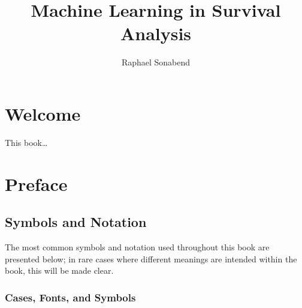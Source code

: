\documentclass[
  letterpaper,
]{scrbook}
\title{Machine Learning in Survival Analysis}
\author{Raphael Sonabend}
\date{}
\renewcommand*\contentsname{Table of contents}
\newcommand\contentsname{Table of contents}
\theoremstyle{plain}
\theoremstyle{definition}
\theoremstyle{remark}
\begin{document}
\frontmatter
\maketitle
\ifdefined\Shaded\renewenvironment{Shaded}{\begin{tcolorbox}[colback={shadecolor}, boxrule=0pt, enhanced, breakable, frame hidden]}{\end{tcolorbox}}\fi

\renewcommand*\contentsname{Table of contents}
{
\setcounter{tocdepth}{2}
\tableofcontents
}
\listoffigures
\listoftables
\mainmatter
{}

\hypertarget{welcome}{%
\chapter*{Welcome}\label{welcome}}


This book\ldots{}


\hypertarget{preface}{%
\chapter*{Preface}\label{preface}}


\hypertarget{symbols-and-notation}{%
\section*{Symbols and Notation}\label{symbols-and-notation}}


The most common symbols and notation used throughout this book are
presented below; in rare cases where different meanings are intended
within the book, this will be made clear.

\hypertarget{cases-fonts-and-symbols}{%
\subsection*{Cases, Fonts, and Symbols}\label{cases-fonts-and-symbols}}
\end{document}
